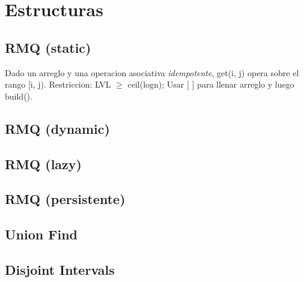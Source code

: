 

\def\title{Flower Power - Universidad Nacional de Rosario}
 
%


\section{Estructuras}%
\subsection{RMQ (static)}
Dado un arreglo y una operacion asociativa \emph{idempotente}, get(i, j) opera sobre el rango [i, j). Restriccion: LVL $\ge$ ceil(logn); Usar [ ] para llenar arreglo y luego build().
\subsection{RMQ (dynamic)}
\subsection{RMQ (lazy)}
\subsection{RMQ (persistente)}
\subsection{Union Find}
\subsection{Disjoint Intervals}
